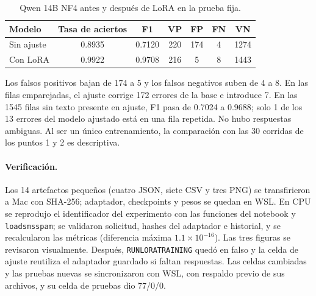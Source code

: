 \documentclass[11pt,letterpaper]{article}
\renewcommand{\_}{\originalunderscore\allowbreak}
\begin{document}
\begin{table}[H]
\centering
\caption{Qwen 14B NF4 antes y después de LoRA en la prueba fija.}
\begin{tabular}{lcccccc}
\toprule
Modelo & Tasa de aciertos & F1 & VP & FP & FN & VN\\
\midrule
Sin ajuste & 0.8935 & 0.7120 & 220 & 174 & 4 & 1274\\
Con LoRA & 0.9922 & 0.9708 & 216 & 5 & 8 & 1443\\
\bottomrule
\end{tabular}
\end{table}

Los falsos positivos bajan de 174 a 5 y los falsos negativos suben de 4 a 8.
En las filas emparejadas, el ajuste corrige 172 errores de la base e
introduce 7. En las 1545 filas sin texto presente en ajuste, F1 pasa de
0.7024 a 0.9688; solo 1 de los 13 errores del modelo ajustado está en una
fila repetida. No hubo respuestas ambiguas. Al ser un único entrenamiento,
la comparación con las 30 corridas de los puntos 1 y 2 es descriptiva.

\paragraph{Verificación.} Los 14 artefactos pequeños (cuatro JSON, siete CSV
y tres PNG) se transfirieron a Mac con SHA-256; adaptador, checkpoints y
pesos se quedan en WSL. En CPU se reprodujo el identificador del
experimento con las funciones del notebook y \texttt{load\_sms\_spam}; se
validaron solicitud, hashes del adaptador e historial, y se recalcularon
las métricas (diferencia máxima $1.1\times10^{-16}$). Las tres figuras se
revisaron visualmente. Después, \texttt{RUN\_LORA\_TRAINING} quedó en
falso y la celda de ajuste reutiliza el adaptador guardado si faltan
respuestas. Las celdas cambiadas y las pruebas nuevas se sincronizaron con
WSL, con respaldo previo de sus archivos, y su celda de pruebas dio 77/0/0.
\end{document}
